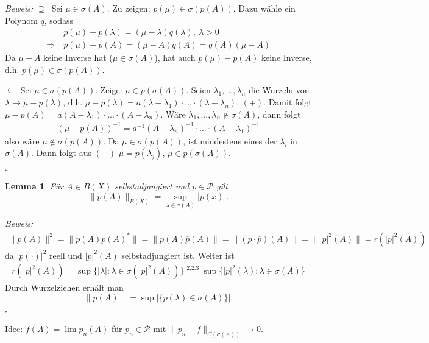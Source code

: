 \documentclass[12pt,a4paper,titlepage]{scrartcl}
\newtheorem{Lemma}[Satz]{Lemma}
\numberwithin{equation}{section}
\newcommand{\m}{\cdot}
\newcommand{\Bew}{\emph{Beweis: }}
\newcommand{\qed}{\begin{flushright}
		$\square$
	\end{flushright}}
\begin{document}
	\Bew \glqq$\supseteq$\grqq\ Sei $\mu\in \sigma(A)$. Zu zeigen: $p(\mu)\in \sigma(p(A))$. Dazu wähle ein Polynom $q$, sodass 
	\begin{align*}
		&~ p(\mu) - p(\lambda) = (\mu-\lambda)q(\lambda), ~\lambda>0\\
		\Rightarrow & ~p(\mu)-p(A) = (\mu-A)q(A) = q(A)(\mu-A)
	\end{align*}
	Da $\mu-A$ keine Inverse hat ($\mu\in \sigma(A)$), hat auch $p(\mu)-p(A)$ keine Inverse, d.h. $p(\mu)\in \sigma(p(A))$.
	
	\glqq$\subseteq$\grqq\ Sei $\mu\in \sigma(p(A))$. Zeige: $\mu\in p(\sigma(A))$. Seien $\lambda_1,...,\lambda_n$ die Wurzeln von $\lambda\rightarrow \mu-p(\lambda)$, d.h. $\mu-p(\lambda) = a(\lambda-\lambda_1)\m...\m (\lambda-\lambda_n)$, $(+)$. Damit folgt $\mu-p(A) = a(A-\lambda_1)\m...\m (A-\lambda_n)$. Wäre $\lambda_1,...,\lambda_n\notin \sigma(A)$, dann folgt 
	\begin{align*}
		(\mu-p(A))^{-1} = a^{-1}(A-\lambda_n)^{-1}\m...\m (A-\lambda_1)^{-1}
	\end{align*}
	also wäre $\mu\notin \sigma(p(A))$. Da $\mu \in \sigma(p(A))$, ist mindestens eines der $\lambda_i$ in $\sigma(A)$. Dann folgt aus $(+)$ $\mu=p(\lambda_j)$, $\mu \in p(\sigma(A))$.
	\qed
	
	
	\begin{Lemma}
		Für $A\in B(X)$ selbstadjungiert und $p\in \mathcal{P}$ gilt 
		$$\|p(A)\|_{B(X)} = \sup_{\lambda\in \sigma(A)}|p(x)|.$$	
	\end{Lemma}
	
	\Bew 
	\begin{align*}
		\|p(A)\|^2 = \|p(A)p(A)^*\| = \|p(A)\overline{p}(A)\| = \| (p\m \overline{p})(A)\| = \||p|^2(A)\| = r(|p|^2(A))
	\end{align*}
	da $|p(\m)|^2$ reell und $|p|^2(A)$ selbstadjungiert ist. Weiter ist
	\begin{align*}
		r(|p|^2(A)) = \sup\{|\lambda| : \lambda\in \sigma(|p|^2(A)) \} \overset{\text{2.2.3}}{=} \sup\{|p|^2(\lambda): \lambda\in \sigma(A) \}
	\end{align*}
	Durch Wurzelziehen erhält man 
	$$\|p(A)\| = \sup|\{p(\lambda)\in \sigma(A) \}|.$$
	\qed
	
	Idee: $f(A) = \lim p_n(A)$ für $p_n\in \mathcal{P}$ mit $\|p_n-f\|_{C(\sigma(A))}\rightarrow 0$.
	
\end{document}
